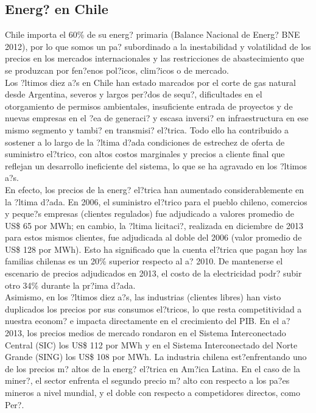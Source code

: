 \subsection{Energ? en Chile}
Chile importa el 60\% de su energ? primaria (Balance Nacional de Energ? BNE 2012), por lo que somos un pa? subordinado a la inestabilidad y volatilidad de los precios en los mercados internacionales y las restricciones de abastecimiento que se produzcan por fen?enos pol?icos, clim?icos o de mercado.\\

Los ?ltimos diez a?s en Chile han estado marcados por el corte de gas natural desde Argentina, severos y largos per?dos de sequ?, dificultades en el otorgamiento de permisos ambientales, insuficiente entrada de proyectos y de nuevas empresas en el ?ea de generaci? y escasa inversi? en infraestructura en ese mismo segmento y tambi? en transmisi? el?trica. Todo ello ha contribuido a sostener a lo largo de la ?ltima d?ada condiciones de estrechez de oferta de suministro el?trico, con altos costos marginales y precios a cliente final que reflejan un desarrollo ineficiente del sistema, lo que se ha agravado en los ?ltimos a?s.\\

En efecto, los precios de la energ? el?trica han aumentado considerablemente en la ?ltima d?ada. En 2006, el suministro el?trico para el pueblo chileno, comercios y peque?s empresas (clientes regulados) fue adjudicado a valores promedio de US\$ 65 por MWh; en cambio, la ?ltima licitaci?, realizada en diciembre de 2013 para estos mismos clientes, fue adjudicada al doble del 2006 (valor promedio de US\$ 128 por MWh). Esto ha significado que la cuenta el?trica que pagan hoy las familias chilenas es un 20\% superior respecto al a? 2010. De mantenerse el escenario de precios adjudicados en 2013, el costo de la electricidad podr? subir otro 34\% durante la pr?ima d?ada.\\

Asimismo, en los ?ltimos diez a?s, las industrias (clientes libres) han visto duplicados los precios por sus consumos el?tricos, lo que resta competitividad a nuestra econom? e impacta directamente en el crecimiento del PIB. En el a? 2013, los precios medios de mercado rondaron en el Sistema Interconectado Central (SIC) los US\$ 112 por MWh y en el Sistema Interconectado del Norte Grande (SING) los US\$ 108 por MWh. La industria chilena est?enfrentando uno de los precios m? altos de la energ? el?trica en Am?ica Latina. En el caso de la miner?, el sector enfrenta el segundo precio m? alto con respecto a los pa?es mineros a nivel mundial, y el doble con respecto a competidores directos, como Per?.

